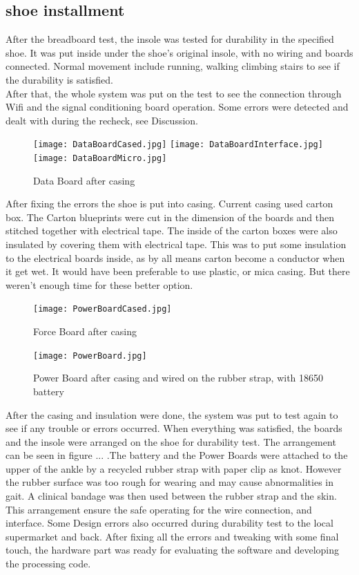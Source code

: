 \documentclass[12 pt, a4paper]{thesis}
\begin{document}
\subsection{shoe installment}
After the breadboard test, the insole was tested for durability in the specified shoe. It was put inside under the shoe's original insole, with no wiring and boards connected. Normal movement include running, walking climbing stairs to see if the durability is satisfied.\\
After that, the whole system was put on the test to see the connection through Wifi and the signal conditioning board operation. Some errors were detected and dealt with during the recheck, see Discussion. \\
\begin{figure}[hbt!]
\centering
\texttt{[image: DataBoardCased.jpg]}
\hfill
\texttt{[image: DataBoardInterface.jpg]}
\hfill
\texttt{[image: DataBoardMicro.jpg]}
\caption{Data Board after casing}
\end{figure}
After fixing the errors the shoe is put into casing. Current casing used carton box. The Carton blueprints were cut in the dimension of the boards and then stitched together with electrical tape. The inside of the carton boxes were also insulated by covering them with electrical tape. This was to put some insulation to the electrical boards inside, as by all means carton become a conductor when it get wet. It would have been preferable to use plastic, or mica casing. But there weren't enough time for these better option.\\
\begin{figure}[hbt!]
\centering
\texttt{[image: PowerBoardCased.jpg]}
\caption{Force Board after casing}
\end{figure}
\begin{figure}[hbt!]
\centering
\texttt{[image: PowerBoard.jpg]}
\caption{Power Board after casing and wired on the rubber strap, with 18650 battery}
\end{figure}
After the casing and insulation were done, the system was put to test again to see if any trouble or errors occurred. When everything was satisfied, the boards and the insole were arranged on the shoe for durability test. The arrangement can be seen in figure ... .The battery and the Power Boards were attached to the upper of the ankle by a recycled rubber strap with paper clip as knot. However the rubber surface was too rough for wearing and may cause abnormalities in gait. A clinical bandage was then used between the rubber strap and the skin. This arrangement ensure the safe operating for the wire connection, and interface. Some Design errors also occurred during durability test to the local supermarket and back. After fixing all the errors and tweaking with some final touch, the hardware part was ready for evaluating the software and developing the processing code.
\end{document}
